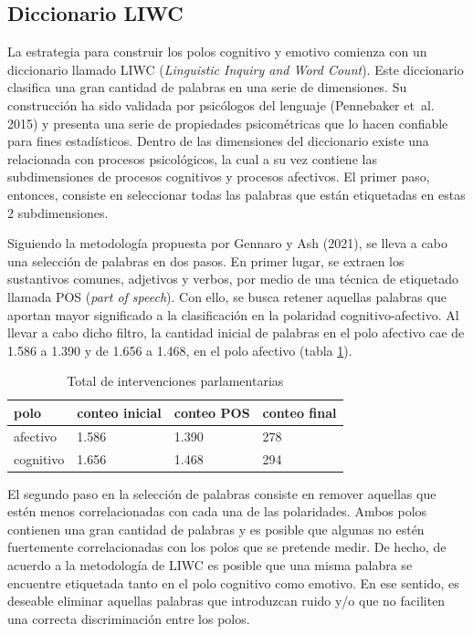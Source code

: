 \documentclass[
  12pt,
]{article}
\begin{document}
\hypertarget{diccionario-liwc}{%
\subsection{Diccionario LIWC}\label{diccionario-liwc}}

La estrategia para construir los polos cognitivo y emotivo comienza con
un diccionario llamado LIWC (\emph{Linguistic Inquiry and Word Count}).
Este diccionario clasifica una gran cantidad de palabras en una serie de
dimensiones. Su construcción ha sido validada por psicólogos del
lenguaje (Pennebaker et~al. 2015) y presenta una serie de propiedades
psicométricas que lo hacen confiable para fines estadísticos. Dentro de
las dimensiones del diccionario existe una relacionada con procesos
psicológicos, la cual a su vez contiene las subdimensiones de procesos
cognitivos y procesos afectivos. El primer paso, entonces, consiste en
seleccionar todas las palabras que están etiquetadas en estas 2
subdimensiones.

Siguiendo la metodología propuesta por Gennaro y Ash (2021), se lleva a
cabo una selección de palabras en dos pasos. En primer lugar, se extraen
los sustantivos comunes, adjetivos y verbos, por medio de una técnica de
etiquetado llamada POS (\emph{part of speech}). Con ello, se busca
retener aquellas palabras que aportan mayor significado a la
clasificación en la polaridad cognitivo-afectivo. Al llevar a cabo dicho
filtro, la cantidad inicial de palabras en el polo afectivo cae de 1.586
a 1.390 y de 1.656 a 1.468, en el polo afectivo (tabla
\ref{tab:tabla_filtro_polos}).

\begin{table}[H]

\caption{\label{tab:tabla_filtro_polos}Total de intervenciones parlamentarias}
\centering
\begin{tabular}[t]{llll}
\toprule
polo & conteo inicial & conteo POS & conteo final\\
\midrule
afectivo & 1.586 & 1.390 & 278\\
cognitivo & 1.656 & 1.468 & 294\\
\bottomrule
\end{tabular}
\end{table}

El segundo paso en la selección de palabras consiste en remover aquellas
que estén menos correlacionadas con cada una de las polaridades. Ambos
polos contienen una gran cantidad de palabras y es posible que algunas
no estén fuertemente correlacionadas con los polos que se pretende
medir. De hecho, de acuerdo a la metodología de LIWC es posible que una
misma palabra se encuentre etiquetada tanto en el polo cognitivo como
emotivo. En ese sentido, es deseable eliminar aquellas palabras que
introduzcan ruido y/o que no faciliten una correcta discriminación entre
los polos.
\end{document}
